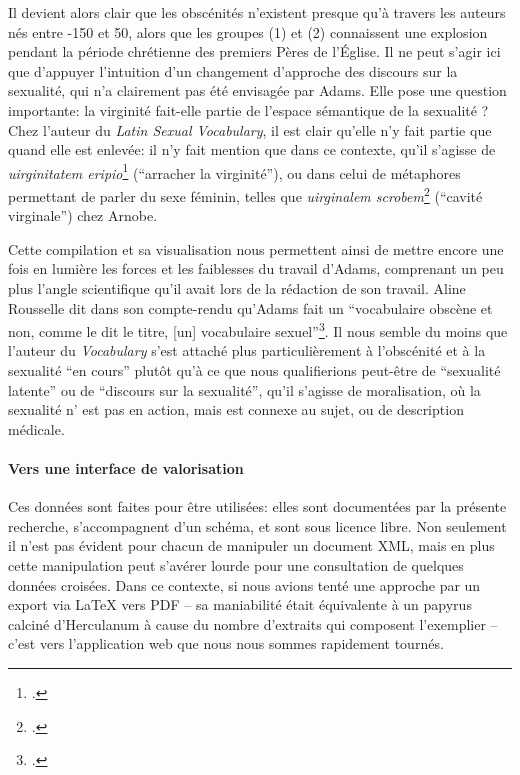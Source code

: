Il devient alors clair que les obscénités n'existent presque qu'à travers les auteurs nés entre -150 et 50, alors que les groupes (1) et (2) connaissent une explosion pendant la période chrétienne des premiers Pères de l'Église. Il ne peut s'agir ici que d'appuyer l'intuition d'un changement d'approche des discours sur la sexualité, qui n'a clairement pas été envisagée par Adams. Elle pose une question importante: la virginité fait-elle partie de l'espace sémantique de la sexualité ? Chez l'auteur du \textit{Latin Sexual Vocabulary}, il est clair qu'elle n'y fait partie que quand elle est enlevée: il n'y fait mention que dans ce contexte, qu'il s'agisse de \textit{uirginitatem eripio}\footcite[p.~195]{adams} (\enquote{arracher la virginité}), ou dans celui de métaphores permettant de parler du sexe féminin, telles que \textit{uirginalem scrobem}\footcite[p.~151]{adams} (\enquote{cavité virginale}) chez Arnobe.

Cette compilation et sa visualisation nous permettent ainsi de mettre encore une fois en lumière les forces et les faiblesses du travail d'Adams, comprenant un peu plus l'angle scientifique qu'il avait lors de la rédaction de son travail. Aline Rousselle dit dans son compte-rendu qu'Adams fait un \enquote{vocabulaire obscène et non, comme le dit le titre, [un] vocabulaire sexuel}\footcite{rousselle_j_1987}. Il nous semble du moins que l'auteur du \textit{Vocabulary} s'est attaché plus particulièrement à l'obscénité et à la sexualité \enquote{en cours} plutôt qu'à ce que nous qualifierions peut-être de \enquote{sexualité latente} ou de \enquote{discours sur la sexualité}, qu'il s'agisse de moralisation, où la sexualité n' est pas en action, mais est connexe au sujet, ou de description médicale.

\paragraph{Vers une interface de valorisation}

Ces données sont faites pour être utilisées: elles sont documentées par la présente recherche, s'accompagnent d'un schéma, et sont sous licence libre. Non seulement il n'est pas évident pour chacun de manipuler un document XML, mais en plus cette manipulation peut s'avérer lourde pour une consultation de quelques données croisées. Dans ce contexte, si nous avions tenté une approche par un export via LaTeX vers PDF -- sa maniabilité était équivalente à un papyrus calciné d'Herculanum à cause du nombre d'extraits qui composent l'exemplier -- c'est vers l'application web que nous nous sommes rapidement tournés.

